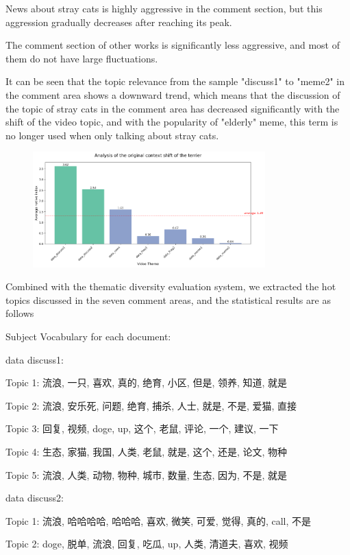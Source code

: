 \documentclass[12pt,a4paper]{ctexart}
\begin{document}
News about stray cats is highly aggressive in the comment section, but this aggression gradually decreases after reaching its peak.

The comment section of other works is significantly less aggressive, and most of them do not have large fluctuations.

It can be seen that the topic relevance from the sample "discuss1" to "meme2" in the comment area shows a downward trend, which means that the discussion of the topic of stray cats in the comment area has decreased significantly with the shift of the video topic, and with the popularity of "elderly" meme, this term is no longer used when only talking about stray cats.

\begin{figure}[htbp]
    \centering
    \includegraphics[width=0.8\textwidth]{img/context_shift.png}
\end{figure}
\newpage

Combined with the thematic diversity evaluation system, we extracted the hot topics discussed in the seven comment areas, and the statistical results are as follows

Subject Vocabulary for each document:

data discuss1:

Topic 1: 流浪, 一只, 喜欢, 真的, 绝育, 小区, 但是, 领养, 知道, 就是

Topic 2: 流浪, 安乐死, 问题, 绝育, 捕杀, 人士, 就是, 不是, 爱猫, 直接

Topic 3: 回复, 视频, doge, up, 这个, 老鼠, 评论, 一个, 建议, 一下

Topic 4: 生态, 家猫, 我国, 人类, 老鼠, 就是, 这个, 还是, 论文, 物种

Topic 5: 流浪, 人类, 动物, 物种, 城市, 数量, 生态, 因为, 不是, 就是

data discuss2:

Topic 1: 流浪, 哈哈哈哈, 哈哈哈, 喜欢, 微笑, 可爱, 觉得, 真的, call, 不是

Topic 2: doge, 脱单, 流浪, 回复, 吃瓜, up, 人类, 清道夫, 喜欢, 视频
\end{document}
